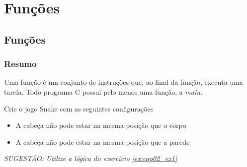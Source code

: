 
\part[Subalgoritmos]
{Funções}


\chapter[Subalgoritmos]
{Funções}



\section{Resumo}

Uma função é um conjunto de instruções que, ao final da função, executa uma tarefa. Todo programa C possui pelo menos uma função, a \emph{main}.

%
%







\begin{problems}
\prob
Crie o jogo Snake com as seguintes configurações
\begin{itemize}
\item
A cabeça não pode estar na mesma posição que o corpo
\item
A cabeça não pode estar na mesma posição que a parede
\end{itemize}
\emph{SUGESTÃO: Utilize a lógica do exercício \ref{ex:cap02_ex1} }

\label{ex:cap03_ex1}
\end{problems}


